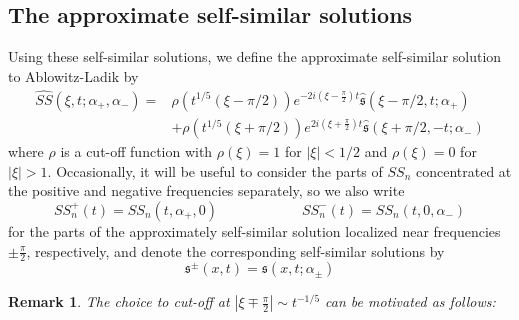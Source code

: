 \documentclass[letterpaper, reqno,final]{amsart}
\newcommand{\fs}{\mathfrak{s}}
\newcommand{\fhPi}{\frac{\pi}{2}}
\newcommand{\mSS}{\mathit{SS}}
\newtheorem{rmk}{Remark}
\begin{document}
\subsection{The approximate self-similar solutions}
Using these self-similar solutions, we define the approximate self-similar solution to Ablowitz-Ladik by
\begin{equation}\begin{split}
    \widehat{\mSS}(\xi, t; \alpha_+, \alpha_-) =& \rho(t^{1/5} (\xi - \pi/2)) e^{-2i(\xi - \fhPi) t}\hat{\fs}(\xi - \pi/2,t;\alpha_+)\\
    &+ \rho(t^{1/5} (\xi + \pi/2)) e^{2i(\xi + \fhPi) t}\hat{\fs}(\xi + \pi/2,-t;\alpha_-)
\end{split}\end{equation}
where $\rho$ is a cut-off function with $\rho(\xi) = 1$ for $|\xi| < 1/2$ and $\rho(\xi) = 0$ for $|\xi| > 1$.  Occasionally, it will be useful to consider the parts of $\mSS_n$ concentrated at the positive and negative frequencies separately, so we also write
\begin{equation}\label{eqn:mssn-pm-def}
    \mSS_n^+(t) = \mSS_n(t, \alpha_+, 0)\qquad\qquad\qquad \mSS_n^-(t) = \mSS_n(t, 0, \alpha_-)
\end{equation}
for the parts of the approximately self-similar solution localized near frequencies $\pm \fhPi$, respectively, and denote the corresponding self-similar solutions by
\begin{equation*}
    \fs^\pm(x,t) = \fs(x,t;\alpha_\pm)
\end{equation*}
\begin{rmk}
    The choice to cut-off at $|\xi \mp \fhPi| \sim t^{-1/5}$ can be motivated as follows: 
\end{rmk}
\end{document}
